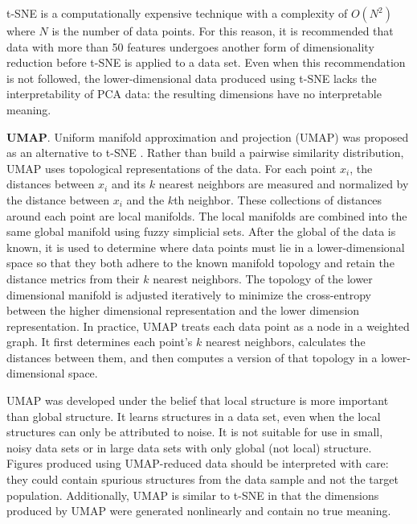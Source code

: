 t-SNE is a computationally expensive technique with a complexity of $O(N^2)$ where $N$ is the number of data points. For this reason, it is recommended that data with more than 50 features undergoes another form of dimensionality reduction before t-SNE is applied to a data set. Even when this recommendation is not followed, the lower-dimensional data produced using t-SNE lacks the interpretability of PCA data: the resulting dimensions have no interpretable meaning.

\textbf{UMAP}. Uniform manifold approximation and projection (UMAP) was proposed as an alternative to t-SNE \cite{McInnes2018}. Rather than build a pairwise similarity distribution, UMAP uses topological representations of the data. For each point $x_i$, the distances between $x_i$ and its $k$ nearest neighbors are measured and normalized by the distance between $x_i$ and the $k$th neighbor. These collections of distances around each point are local manifolds. The local manifolds are combined into the same global manifold using fuzzy simplicial sets. After the global of the data is known, it is used to determine where data points must lie in a lower-dimensional space so that they both adhere to the known manifold topology and retain the distance metrics from their $k$ nearest neighbors. The topology of the lower dimensional manifold is adjusted iteratively to minimize the cross-entropy between the higher dimensional representation and the lower dimension representation. In practice, UMAP treats each data point as a node in a weighted graph. It first determines each point's $k$ nearest neighbors, calculates the distances between them, and then computes a version of that topology in a lower-dimensional space.

UMAP was developed under the belief that local structure is more important than global structure. It learns structures in a data set, even when the local structures can only be attributed to noise. It is not suitable for use in small, noisy data sets or in large data sets with only global (not local) structure. Figures produced using UMAP-reduced data should be interpreted with care: they could contain spurious structures from the data sample and not the target population. Additionally, UMAP is similar to t-SNE in that the dimensions produced by UMAP were generated nonlinearly and contain no true meaning. 

